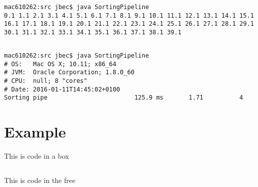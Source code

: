 \documentclass{ituhandin}
\begin{document}
\begin{lstlisting}[language={},frame={}]
mac610262:src jbec$ java SortingPipeline
0.1 1.1 2.1 3.1 4.1 5.1 6.1 7.1 8.1 9.1 10.1 11.1 12.1 13.1 14.1 15.1 16.1 17.1 18.1 19.1 20.1 21.1 22.1 23.1 24.1 25.1 26.1 27.1 28.1 29.1 30.1 31.1 32.1 33.1 34.1 35.1 36.1 37.1 38.1 39.1
\end{lstlisting}
\section{} %
\begin{lstlisting}[language={},frame={}]
mac610262:src jbec$ java SortingPipeline
# OS:   Mac OS X; 10.11; x86_64
# JVM:  Oracle Corporation; 1.8.0_60
# CPU:  null; 8 "cores"
# Date: 2016-01-11T14:45:02+0100
Sorting pipe                        125.9 ms       1.71          4
\end{lstlisting}
\chapter{} %
\chapter{} %
\chapter{} %
\chapter{} %
\chapter{} %
\chapter{} %
\chapter{} %

\chapter*{Example}

This is code in a box

\begin{lstlisting}[caption=This is a caption]
\end{lstlisting}


This is code in the free

\begin{lstlisting}[frame={}]
\end{lstlisting}




\label{LastPage}
\end{document}
